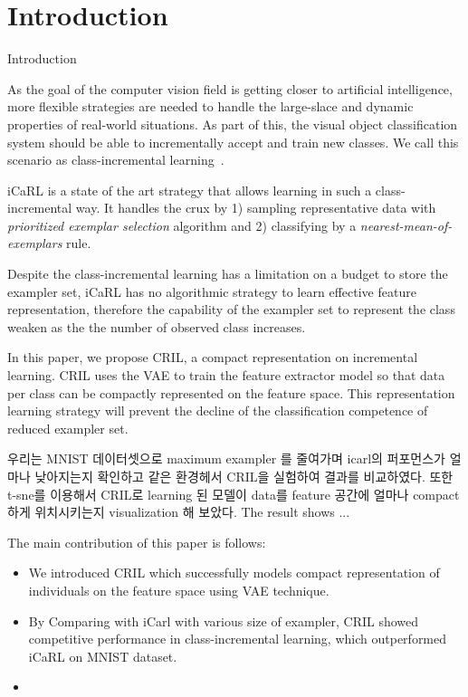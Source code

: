 \section{Introduction}
\label{sec:introduction}

Introduction

As the goal of the computer vision field is getting closer to artificial intelligence, more flexible strategies are needed to handle the large-slace and dynamic properties of real-world situations. As part of this, the visual object classification system should be able to incrementally accept and train new classes. We call this scenario as class-incremental learning~\cite{Rebuffi:2016aa}.

iCaRL is a state of the art strategy that allows learning in such a class-incremental way. It handles the crux by 1) sampling representative data with \textit{prioritized exemplar selection} algorithm and 2) classifying by a \textit{nearest-mean-of-exemplars} rule.

Despite the class-incremental learning has a limitation on a budget to store the exampler set, iCaRL has no algorithmic strategy to learn effective feature representation, therefore the capability of the exampler set to represent the class weaken as the the number of observed class increases.

In this paper, we propose CRIL, a compact representation on incremental learning. CRIL uses the VAE to train the feature extractor model so that data per class can be compactly represented on the feature space. This representation learning strategy will prevent the decline of the classification competence of reduced exampler set.



우리는 MNIST 데이터셋으로 maximum exampler 를 줄여가며 icarl의 퍼포먼스가 얼마나 낮아지는지 확인하고 같은 환경헤서 CRIL을 실험하여 결과를 비교하였다. 또한 t-sne를 이용해서 CRIL로 learning 된 모델이 data를 feature 공간에 얼마나 compact하게 위치시키는지 visualization 해 보았다. The result shows ...

The main contribution of this paper is follows:
\begin{itemize}
\item We introduced CRIL which successfully models compact representation of individuals on the feature space using VAE technique.
\item By Comparing with iCarl with various size of exampler, CRIL showed competitive performance in class-incremental learning, which outperformed iCaRL on MNIST dataset.
\item {}
\end{itemize}

